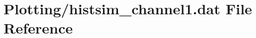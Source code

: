 \hypertarget{Plotting_2histsim__channel1_8dat}{}\section{Plotting/histsim\+\_\+channel1.dat File Reference}
\label{Plotting_2histsim__channel1_8dat}
